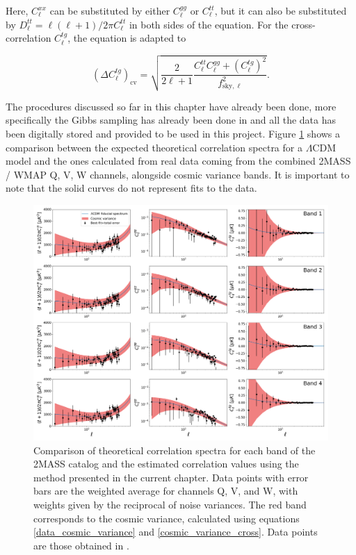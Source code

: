 \documentclass[openany,a4paper,12pt,oneside]{book}
\begin{document}
\begin{spacing}{1.5}
Here, $C_\ell^{xx}$ can be substituted by either $C_\ell^{gg}$ or $C_\ell^{tt}$, but it can also be substituted by $D_\ell^{tt}=\ell(\ell+1)/2\pi C_\ell^{tt}$ in both sides of the equation. For the cross-correlation $C_\ell^{tg}$, the equation is adapted to

\begin{equation}\label{cosmic_variance_cross}
	(\Delta C_\ell^{tg})_\text{cv}=\sqrt{\frac{2}{2\ell+1}\frac{C_\ell^{tt}C_\ell^{gg}+(C_\ell^{tg})^2}{f_{\text{sky},\ell}^2}}.
\end{equation}

The procedures discussed so far in this chapter have already been done, more specifically the Gibbs sampling has already been done in \cite{Moura-Santos_2016} and all the data has been digitally stored and provided to be used in this project. Figure \ref{fig:correlation_data_final_plots} shows a comparison between the expected theoretical correlation spectra for a $\Lambda$CDM model and the ones calculated from real data coming from the combined 2MASS / WMAP Q, V, W channels, alongside cosmic variance bands. It is important to note that the solid curves do not represent fits to the data.

\begin{figure}[!htb]
	\centering
	\includegraphics[width=\linewidth]{Imagens/Full_Data_Plot.png}
	\caption{Comparison of theoretical correlation spectra for each band of the 2MASS catalog and the estimated correlation values using the method presented in the current chapter. Data points with error bars are the weighted average for channels Q, V, and W, with weights given by the reciprocal of noise variances. The red band corresponds to the cosmic variance, calculated using equations \eqref{data_cosmic_variance} and \eqref{cosmic_variance_cross}. Data points are those obtained in \cite{Moura-Santos_2016}.}
	\label{fig:correlation_data_final_plots}
\end{figure}


\end{spacing}
\end{document}

